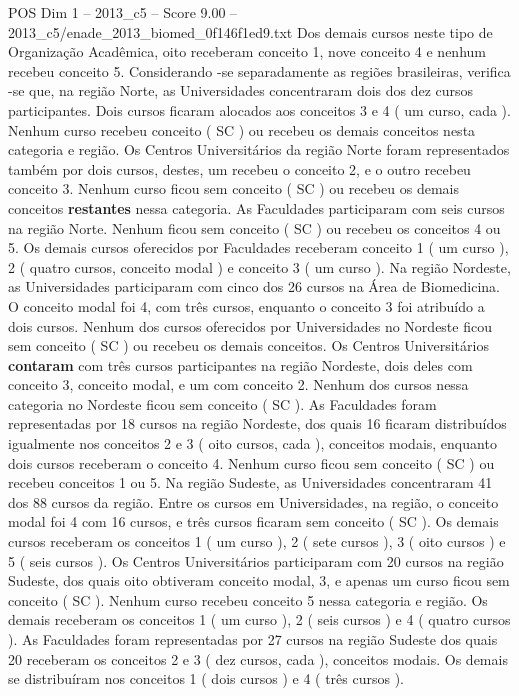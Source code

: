 \begin{textsample}{POS Dim 1 – 2013\_c5 – Score 9.00 – 2013\_c5/enade\_2013\_biomed\_0f146f1ed9.txt}
Dos demais cursos neste tipo de Organização Acadêmica, oito receberam conceito 1, nove conceito 4 e nenhum recebeu conceito 5.
Considerando -se separadamente as regiões brasileiras, verifica -se que, na região Norte, as Universidades concentraram dois dos dez cursos participantes.
Dois cursos ficaram alocados aos conceitos 3 e 4 ( um curso, cada ).
Nenhum curso recebeu conceito ( SC ) ou recebeu os demais conceitos nesta categoria e região.
Os Centros Universitários da região Norte foram representados também por dois cursos, destes, um recebeu o conceito 2, e o outro recebeu conceito 3.
Nenhum curso ficou sem conceito ( SC ) ou recebeu os demais conceitos \textbf{restantes} nessa categoria.
As Faculdades participaram com seis cursos na região Norte.
Nenhum ficou sem conceito ( SC ) ou recebeu os conceitos 4 ou 5.
Os demais cursos oferecidos por Faculdades receberam conceito 1 ( um curso ), 2 ( quatro cursos, conceito modal ) e conceito 3 ( um curso ).
Na região Nordeste, as Universidades participaram com cinco dos 26 cursos na Área de Biomedicina.
O conceito modal foi 4, com três cursos, enquanto o conceito 3 foi atribuído a dois cursos.
Nenhum dos cursos oferecidos por Universidades no Nordeste ficou sem conceito ( SC ) ou recebeu os demais conceitos.
Os Centros Universitários \textbf{contaram} com três cursos participantes na região Nordeste, dois deles com conceito 3, conceito modal, e um com conceito 2.
Nenhum dos cursos nessa categoria no Nordeste ficou sem conceito ( SC ).
As Faculdades foram representadas por 18 cursos na região Nordeste, dos quais 16 ficaram distribuídos igualmente nos conceitos 2 e 3 ( oito cursos, cada ), conceitos modais, enquanto dois cursos receberam o conceito 4.
Nenhum curso ficou sem conceito ( SC ) ou recebeu conceitos 1 ou 5.
Na região Sudeste, as Universidades concentraram 41 dos 88 cursos da região.
Entre os cursos em Universidades, na região, o conceito modal foi 4 com 16 cursos, e três cursos ficaram sem conceito ( SC ).
Os demais cursos receberam os conceitos 1 ( um curso ), 2 ( sete cursos ), 3 ( oito cursos ) e 5 ( seis cursos ).
Os Centros Universitários participaram com 20 cursos na região Sudeste, dos quais oito obtiveram conceito modal, 3, e apenas um curso ficou sem conceito ( SC ).
Nenhum curso recebeu conceito 5 nessa categoria e região.
Os demais receberam os conceitos 1 ( um curso ), 2 ( seis cursos ) e 4 ( quatro cursos ).
As Faculdades foram representadas por 27 cursos na região Sudeste dos quais 20 receberam os conceitos 2 e 3 ( dez cursos, cada ), conceitos modais.
Os demais se distribuíram nos conceitos 1 ( dois cursos ) e 4 ( três cursos ).

\end{textsample}
